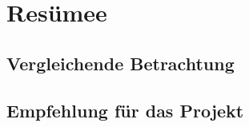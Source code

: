 

\chapter{Resümee}
\section{Vergleichende Betrachtung}



\section{Empfehlung für das Projekt}




